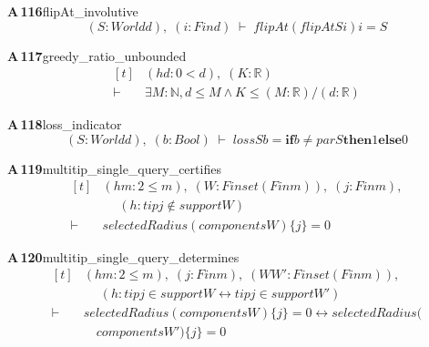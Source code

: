 \documentclass[conference]{IEEEtran}
\theoremstyle{definition}
\newcommand{\lean}[1]{\textsf{\footnotesize #1}}
\begin{document}
\noindent\textbf{A\,116}\quad\lean{flipAt\_involutive}
{\footnotesize\[ (\mathit{S} : \mathit{World} \mathit{d}),\; (\mathit{i} : \mathit{Fin} \mathit{d}) \;\vdash\; \mathit{flipAt} (\mathit{flipAt} \mathit{S} \mathit{i}) \mathit{i} = \mathit{S} \]}

\noindent\textbf{A\,117}\quad\lean{greedy\_ratio\_unbounded}
{\footnotesize\[ \begin{aligned}[t]
&(\mathit{hd} : 0 < \mathit{d}),\; (\mathit{K} : \mathbb{R} )\\
\vdash\;&\exists \mathit{M} : \mathbb{N} , \mathit{d} \leq \mathit{M} \wedge \mathit{K} \leq (\mathit{M} : \mathbb{R} ) / (\mathit{d} : \mathbb{R} )
\end{aligned} \]}

\noindent\textbf{A\,118}\quad\lean{loss\_indicator}
{\footnotesize\[ (\mathit{S} : \mathit{World} \mathit{d}),\; (\mathit{b} : \mathit{Bool}) \;\vdash\; \mathit{loss} \mathit{S} \mathit{b} = \mathbf{if} \mathit{b} \neq \mathit{par} \mathit{S} \mathbf{then} 1 \mathbf{else} 0 \]}

\noindent\textbf{A\,119}\quad\lean{multitip\_single\_query\_certifies}
{\footnotesize\[ \begin{aligned}[t]
&(\mathit{hm} : 2 \leq \mathit{m}),\; (\mathit{W} : \mathit{Finset} (\mathit{Fin} \mathit{m})),\; (\mathit{j} : \mathit{Fin} \mathit{m}),\\
&\quad \; (\mathit{h} : \mathit{tip} \mathit{j} \notin \mathit{support} \mathit{W})\\
\vdash\;&\mathit{selectedRadius} (\mathit{components} \mathit{W}) \{ \mathit{j}\} = 0
\end{aligned} \]}

\noindent\textbf{A\,120}\quad\lean{multitip\_single\_query\_determines}
{\footnotesize\[ \begin{aligned}[t]
&(\mathit{hm} : 2 \leq \mathit{m}),\; (\mathit{j} : \mathit{Fin} \mathit{m}),\; (\mathit{W} \mathit{W'} : \mathit{Finset} (\mathit{Fin} \mathit{m})),\\
&\quad \; (\mathit{h} : \mathit{tip} \mathit{j} \in \mathit{support} \mathit{W} \leftrightarrow \mathit{tip} \mathit{j} \in \mathit{support} \mathit{W'})\\
\vdash\;&\mathit{selectedRadius} (\mathit{components} \mathit{W}) \{ \mathit{j}\} = 0 \leftrightarrow \mathit{selectedRadius} (\\
&\quad \mathit{components} \mathit{W'}) \{ \mathit{j}\} = 0
\end{aligned} \]}
\end{document}
